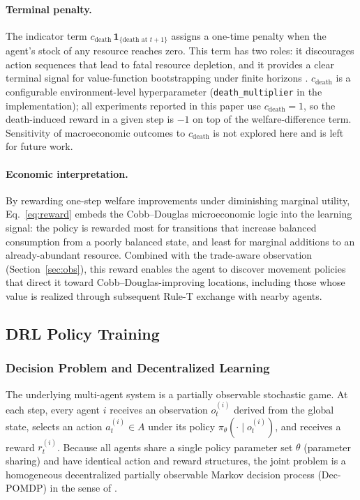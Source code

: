 \documentclass[pdflatex,sn-mathphys-num]{sn-jnl}%
\theoremstyle{thmstyleone}%
\theoremstyle{thmstyletwo}%
\theoremstyle{thmstylethree}%
\begin{document}
\paragraph{Terminal penalty.}
The indicator term $c_{\text{death}}\,\mathbf{1}_{\{\text{death at } t+1\}}$ assigns a one-time penalty when the agent's stock of any resource reaches zero.  
This term has two roles: it discourages action sequences that lead to fatal resource depletion, and it provides a clear terminal signal for value-function bootstrapping under finite horizons \citep{Ng1999, Sert2020}.  
$c_{\text{death}}$ is a configurable environment-level hyperparameter (\texttt{death\_multiplier} in the implementation); all experiments reported in this paper use $c_{\text{death}} = 1$, so the death-induced reward in a given step is $-1$ on top of the welfare-difference term.  
Sensitivity of macroeconomic outcomes to $c_{\text{death}}$ is not explored here and is left for future work.

\paragraph{Economic interpretation.}
By rewarding one-step welfare improvements under diminishing marginal utility, Eq.~\eqref{eq:reward} embeds the Cobb--Douglas microeconomic logic into the learning signal: the policy is rewarded most for transitions that increase balanced consumption from a poorly balanced state, and least for marginal additions to an already-abundant resource.  
Combined with the trade-aware observation (Section~\ref{sec:obs}), this reward enables the agent to discover movement policies that direct it toward Cobb--Douglas-improving locations, including those whose value is realized through subsequent Rule-T exchange with nearby agents.

\subsection{DRL Policy Training}
\subsubsection{Decision Problem and Decentralized Learning}
\label{sec:mdp}

The underlying multi-agent system is a partially observable stochastic game.  
At each step, every agent $i$ receives an observation $o_t^{(i)}$ derived from the global state, selects an action $a_t^{(i)} \in A$ under its policy $\pi_\theta(\cdot \mid o_t^{(i)})$, and receives a reward $r_t^{(i)}$.  
Because all agents share a single policy parameter set $\theta$ (parameter sharing) and have identical action and reward structures, the joint problem is a homogeneous decentralized partially observable Markov decision process (Dec-POMDP) in the sense of \citet{OliehoekAmato2016}.
\end{document}
